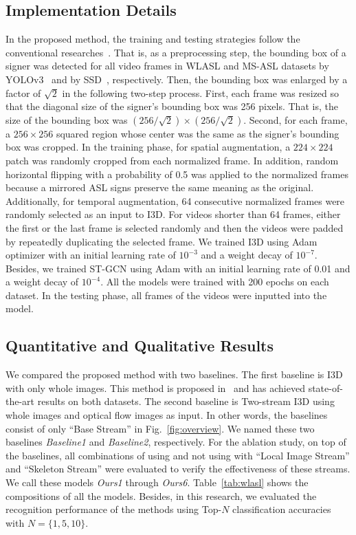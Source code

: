 \documentclass[journal]{IEEEtran}
\begin{document}
\subsection{Implementation Details}
In the proposed method, the training and testing strategies follow the conventional researches~\cite{li2020word, vaezi2019ms-asl}.
That is, as a preprocessing step, the bounding box of a signer was detected for all video frames in WLASL and MS-ASL datasets by YOLOv3~\cite{redmon2018yolov3} and by SSD~\cite{liu2016ssd}, respectively.
Then, the bounding box was enlarged by a factor of $\sqrt{2}$ in the following two-step process.
First, each frame was resized so that the diagonal size of the signer's bounding box was 256 pixels.
That is, the size of the bounding box was $(256/\sqrt{2}) \times (256/\sqrt{2})$.
Second, for each frame, a $256 \times 256$ squared region whose center was the same as the signer's bounding box was cropped.
In the training phase, for spatial augmentation, a $224 \times 224$ patch was randomly cropped from each normalized frame.
In addition, random horizontal flipping with a probability of 0.5 was applied to the normalized frames because a mirrored ASL signs preserve the same meaning as the original.
Additionally, for temporal augmentation, 64 consecutive normalized frames were randomly selected as an input to I3D.
For videos shorter than 64 frames, either the first or the last frame is selected randomly and then 
the videos were padded by repeatedly duplicating the selected frame. 
We trained I3D using Adam optimizer with an initial learning rate of $10^{-3}$ and a weight decay of $10^{-7}$. 
Besides, we trained ST-GCN using Adam with an initial learning rate of 0.01  and a weight decay of $10^{-4}$.
All the models were trained with 200 epochs on each dataset.
In the testing phase, all frames of the videos were inputted into the model.



\subsection{Quantitative and Qualitative Results}
We compared the proposed method with two baselines.
The first baseline is I3D with only whole images.
This method is proposed in~\cite{li2020word, vaezi2019ms-asl} and has achieved state-of-the-art results on both datasets.
The second baseline is Two-stream I3D using whole images and optical flow images as input.
In other words, the baselines consist of only ``Base Stream'' in Fig.~\ref{fig:overview}.
We named these two baselines \textit{Baseline1} and \textit{Baseline2}, respectively.
For the ablation study, on top of the baselines, all combinations of using and not using with ``Local Image Stream'' and ``Skeleton Stream'' were evaluated to verify the effectiveness of these streams.
We call these models \textit{Ours1} through \textit{Ours6}.
Table~\ref{tab:wlasl} shows the compositions of all the models.
Besides, in this research, we evaluated the recognition performance of the methods using Top-$N$ classification accuracies with $N=\{1, 5, 10\}$.
\end{document}
